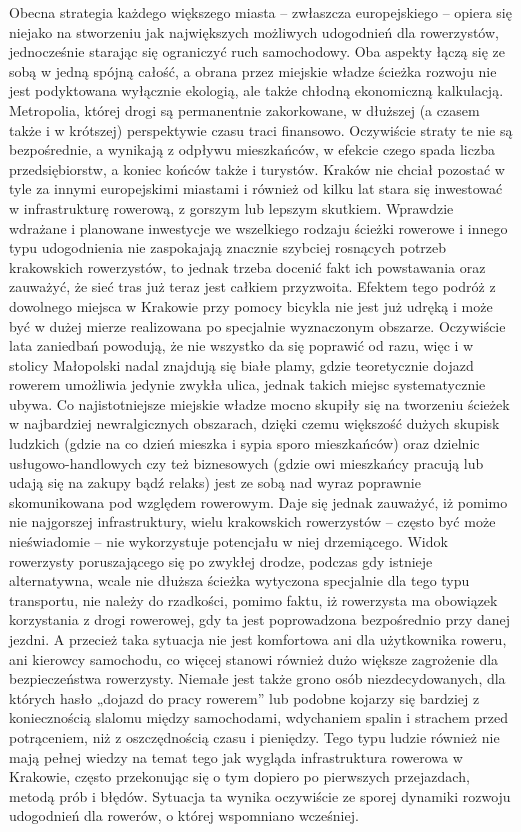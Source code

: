 Obecna strategia każdego większego miasta – zwłaszcza europejskiego – opiera się niejako na stworzeniu jak największych możliwych udogodnień dla rowerzystów, jednocześnie starając się ograniczyć ruch samochodowy. Oba aspekty łączą się ze sobą w jedną spójną całość, a obrana przez miejskie władze ścieżka rozwoju nie jest podyktowana wyłącznie ekologią, ale także chłodną ekonomiczną kalkulacją. Metropolia, której drogi są permanentnie zakorkowane, w dłuższej (a czasem także i w krótszej) perspektywie czasu traci finansowo. Oczywiście straty te nie są bezpośrednie, a wynikają z odpływu mieszkańców, w efekcie czego spada liczba przedsiębiorstw, a koniec końców także i turystów.  Kraków nie chciał pozostać w tyle za innymi europejskimi miastami i również od kilku lat stara się inwestować w infrastrukturę rowerową, z gorszym lub lepszym skutkiem. Wprawdzie wdrażane i planowane inwestycje we wszelkiego rodzaju ścieżki rowerowe i innego typu udogodnienia nie zaspokajają znacznie szybciej rosnących potrzeb krakowskich rowerzystów, to jednak trzeba docenić fakt ich powstawania oraz zauważyć, że sieć tras już teraz jest całkiem przyzwoita. Efektem tego podróż z dowolnego miejsca w Krakowie przy pomocy bicykla nie jest już udręką i może być w dużej mierze realizowana po specjalnie wyznaczonym obszarze. Oczywiście lata zaniedbań powodują, że nie wszystko da się poprawić od razu, więc i w stolicy Małopolski nadal znajdują się białe plamy, gdzie teoretycznie dojazd rowerem umożliwia jedynie zwykła ulica, jednak takich miejsc systematycznie ubywa. Co najistotniejsze miejskie władze mocno skupiły się na tworzeniu ścieżek w najbardziej newralgicznych obszarach, dzięki czemu większość dużych skupisk ludzkich (gdzie na co dzień mieszka i sypia sporo mieszkańców) oraz dzielnic usługowo-handlowych czy też biznesowych (gdzie owi mieszkańcy pracują lub udają się na zakupy bądź relaks) jest ze sobą nad wyraz poprawnie skomunikowana pod względem rowerowym. \newline
Daje się jednak zauważyć, iż pomimo nie najgorszej infrastruktury, wielu krakowskich rowerzystów – często być może nieświadomie – nie wykorzystuje potencjału w niej drzemiącego. Widok rowerzysty poruszającego się po zwykłej drodze, podczas gdy istnieje alternatywna, wcale nie dłuższa ścieżka wytyczona specjalnie dla tego typu transportu, nie należy do rzadkości, pomimo faktu, iż rowerzysta ma obowiązek korzystania z drogi rowerowej, gdy ta jest poprowadzona bezpośrednio przy danej jezdni. A przecież taka sytuacja nie jest komfortowa ani dla użytkownika roweru, ani kierowcy samochodu, co więcej stanowi również dużo większe zagrożenie dla bezpieczeństwa rowerzysty. Niemałe jest także grono osób niezdecydowanych, dla których hasło „dojazd do pracy rowerem” lub podobne kojarzy się bardziej z koniecznością slalomu między samochodami, wdychaniem spalin i strachem przed potrąceniem, niż z oszczędnością czasu i pieniędzy. Tego typu ludzie również nie mają pełnej wiedzy na temat tego jak wygląda infrastruktura rowerowa w Krakowie, często przekonując się o tym dopiero po pierwszych przejazdach, metodą prób i błędów. Sytuacja ta wynika oczywiście ze sporej dynamiki rozwoju udogodnień dla rowerów, o której wspomniano wcześniej.
